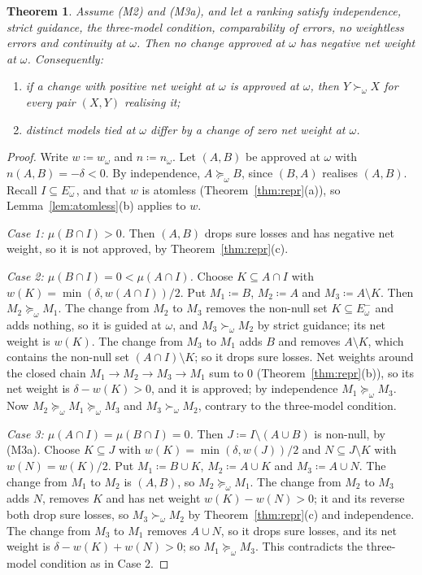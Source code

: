 \documentclass[11pt]{article}
\newtheorem{theorem}{Theorem}[section]
\theoremstyle{definition}
\newcommand{\Em}{E^{-}}
\begin{document}
\begin{theorem}\label{thm:noworse}
Assume (M2) and (M3a), and let a ranking satisfy independence, strict guidance, the three-model condition, comparability of errors, no weightless errors and continuity at $\omega$. Then no change approved at $\omega$ has negative net weight at $\omega$. Consequently:
\begin{enumerate}[label=(\alph*)]
\item if a change with positive net weight at $\omega$ is approved at $\omega$, then $Y\succ_\omega X$ for every pair $(X,Y)$ realising it;
\item distinct models tied at $\omega$ differ by a change of zero net weight at $\omega$.
\end{enumerate}
\end{theorem}
\begin{proof}
Write $w\coloneqq w_\omega$ and $n\coloneqq n_\omega$. Let $(A,B)$ be approved at $\omega$ with $n(A,B)=-\delta<0$. By independence, $A\succeq_\omega B$, since $(B,A)$ realises $(A,B)$. Recall $I\subseteq\Em_\omega$, and that $w$ is atomless (Theorem~\ref{thm:repr}(a)), so Lemma~\ref{lem:atomless}(b) applies to $w$.

\emph{Case 1: $\mu(B\cap I)>0$.} Then $(A,B)$ drops sure losses and has negative net weight, so it is not approved, by Theorem~\ref{thm:repr}(c).

\emph{Case 2: $\mu(B\cap I)=0<\mu(A\cap I)$.} Choose $K\subseteq A\cap I$ with $w(K)=\min(\delta,w(A\cap I))/2$. Put $M_1\coloneqq B$, $M_2\coloneqq A$ and $M_3\coloneqq A\setminus K$. Then $M_2\succeq_\omega M_1$. The change from $M_2$ to $M_3$ removes the non-null set $K\subseteq\Em_\omega$ and adds nothing, so it is guided at $\omega$, and $M_3\succ_\omega M_2$ by strict guidance; its net weight is $w(K)$. The change from $M_3$ to $M_1$ adds $B$ and removes $A\setminus K$, which contains the non-null set $(A\cap I)\setminus K$; so it drops sure losses. Net weights around the closed chain $M_1\to M_2\to M_3\to M_1$ sum to $0$ (Theorem~\ref{thm:repr}(b)), so its net weight is $\delta-w(K)>0$, and it is approved; by independence $M_1\succeq_\omega M_3$. Now $M_2\succeq_\omega M_1\succeq_\omega M_3$ and $M_3\succ_\omega M_2$, contrary to the three-model condition.

\emph{Case 3: $\mu(A\cap I)=\mu(B\cap I)=0$.} Then $J\coloneqq I\setminus(A\cup B)$ is non-null, by (M3a). Choose $K\subseteq J$ with $w(K)=\min(\delta,w(J))/2$ and $N\subseteq J\setminus K$ with $w(N)=w(K)/2$. Put $M_1\coloneqq B\cup K$, $M_2\coloneqq A\cup K$ and $M_3\coloneqq A\cup N$. The change from $M_1$ to $M_2$ is $(A,B)$, so $M_2\succeq_\omega M_1$. The change from $M_2$ to $M_3$ adds $N$, removes $K$ and has net weight $w(K)-w(N)>0$; it and its reverse both drop sure losses, so $M_3\succ_\omega M_2$ by Theorem~\ref{thm:repr}(c) and independence. The change from $M_3$ to $M_1$ removes $A\cup N$, so it drops sure losses, and its net weight is $\delta-w(K)+w(N)>0$; so $M_1\succeq_\omega M_3$. This contradicts the three-model condition as in Case 2.


\end{proof}
\end{document}
